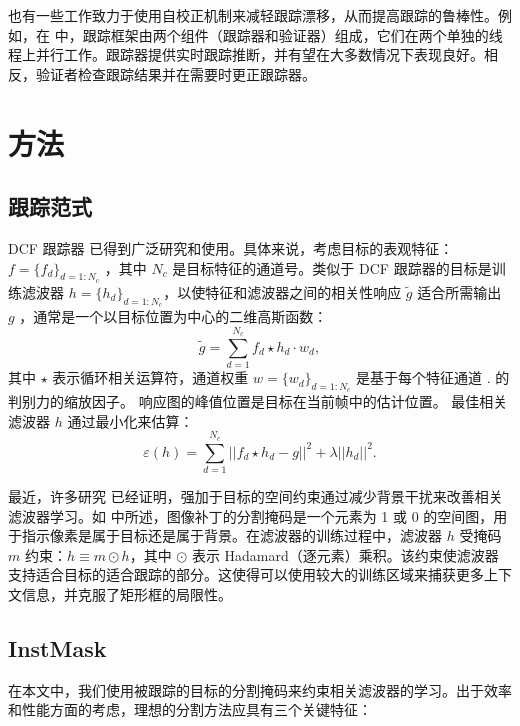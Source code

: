 也有一些工作致力于使用自校正机制来减轻跟踪漂移，从而提高跟踪的鲁棒性。例如，在 \cite{fan2018parallel} 中，跟踪框架由两个组件（跟踪器和验证器）组成，它们在两个单独的线程上并行工作。跟踪器提供实时跟踪推断，并有望在大多数情况下表现良好。相反，验证者检查跟踪结果并在需要时更正跟踪器。

\section{方法}

\subsection{跟踪范式}
DCF 跟踪器 \cite{Danelljan2014AccurateSE, henriques2014high-speed, Li2014ASA} 已得到广泛研究和使用。具体来说，考虑目标的表观特征：$f=\{f_d\}_{d=1:N_c}$ ，其中 $N_c$ 是目标特征的通道号。类似于 DCF 跟踪器的目标是训练滤波器 $h=\{h_d\}_{d=1:N_c}$，以使特征和滤波器之间的相关性响应 $\tilde{g}$ 适合所需输出 $g$ ，通常是一个以目标位置为中心的二维高斯函数： 
\begin{equation} \label{eq:dcf}
\tilde{g}=\sum_{d=1}^{N_c}f_d \star h_d \cdot w_d,
\end{equation}
其中 $\star$ 表示循环相关运算符，通道权重 $w = \{w_d\}_{d=1:N_c}$ 是基于每个特征通道 \cite{Lukezic2017DiscriminativeCF}.
的判别力的缩放因子。
响应图的峰值位置是目标在当前帧中的估计位置。
最佳相关滤波器 $h$ 通过最小化来估算：
\begin{equation}
\varepsilon(h) = \sum_{d=1}^{N_c}||f_d \star h_d - g||^2+\lambda||h_d||^2.
\end{equation}

最近，许多研究 \cite{Danelljan2015LearningSR, Lukezic2017DiscriminativeCF} 已经证明，强加于目标的空间约束通过减少背景干扰来改善相关滤波器学习。如 \cite{Lukezic2017DiscriminativeCF}中所述，图像补丁的分割掩码是一个元素为 1 或 0 的空间图，用于指示像素是属于目标还是属于背景。在滤波器的训练过程中，滤波器 $h$ 受掩码 $m$ 约束：$h \equiv m \odot h$，其中 $\odot$ 表示 Hadamard（逐元素）乘积。该约束使滤波器支持适合目标的适合跟踪的部分。这使得可以使用较大的训练区域来捕获更多上下文信息，并克服了矩形框的局限性。

\subsection{InstMask}
\label{sec:InstMask}
在本文中，我们使用被跟踪的目标的分割掩码来约束相关滤波器的学习。出于效率和性能方面的考虑，理想的分割方法应具有三个关键特征：

